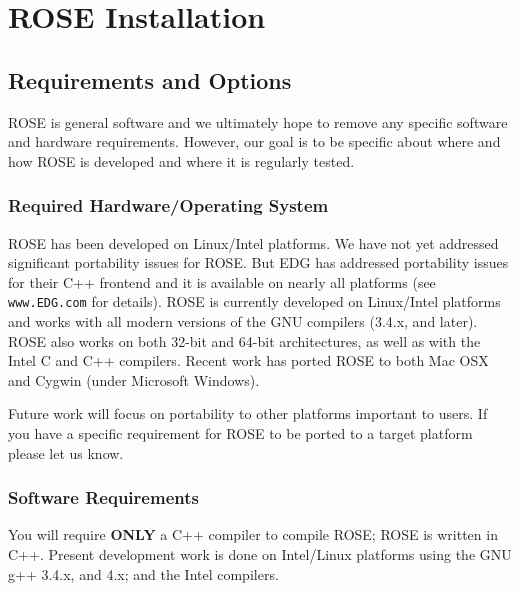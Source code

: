 \section{ROSE Installation}

\subsection{Requirements and Options}
\label{Requirements_Installation_Testing}
   ROSE is general software and we ultimately hope to remove any specific software
and hardware requirements.  However, our goal is to be specific about where and 
how ROSE is developed and where it is regularly tested.

\subsubsection{Required Hardware/Operating System}
   ROSE has been developed on Linux/Intel platforms. We have not yet 
addressed significant portability issues for ROSE. But EDG has addressed
portability issues for their C++ frontend and it is available on nearly all
platforms (see {\tt www.EDG.com} for details).  ROSE is currently developed on
Linux/Intel platforms and works with all modern versions of the GNU compilers 
(3.4.x, and later). ROSE also works on both 32-bit and 64-bit architectures, 
as well as with the Intel C and C++ compilers.  Recent work has ported ROSE
to both Mac OSX and Cygwin (under Microsoft Windows).

Future work will focus on portability to other platforms important to users.
If you have a specific requirement for ROSE to be ported to a target platform
please let us know.

\subsubsection{Software Requirements}
   You will require {\bf ONLY} a C++ compiler to compile ROSE; ROSE is written in C++.
Present development work is done on Intel/Linux platforms
using the GNU g++ 3.4.x, and 4.x; and the Intel compilers.  


